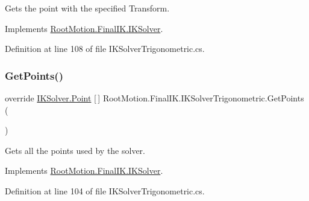 Gets the point with the specified Transform. 



Implements \mbox{\hyperlink{class_root_motion_1_1_final_i_k_1_1_i_k_solver_a8e845886025fb0ca404b85f6747f7281}{Root\+Motion.\+Final\+I\+K.\+I\+K\+Solver}}.



Definition at line 108 of file I\+K\+Solver\+Trigonometric.\+cs.

\mbox{\label{class_root_motion_1_1_final_i_k_1_1_i_k_solver_trigonometric_a4cdd035f3007bc29385299e6d3c3cea9}} 
\subsubsection{\texorpdfstring{Get\+Points()}{GetPoints()}}
{\footnotesize\ttfamily override \mbox{\hyperlink{class_root_motion_1_1_final_i_k_1_1_i_k_solver_1_1_point}{I\+K\+Solver.\+Point}} \mbox{[}$\,$\mbox{]} Root\+Motion.\+Final\+I\+K.\+I\+K\+Solver\+Trigonometric.\+Get\+Points (\begin{DoxyParamCaption}{ }\end{DoxyParamCaption})\hspace{0.3cm}{\ttfamily [virtual]}}



Gets all the points used by the solver. 



Implements \mbox{\hyperlink{class_root_motion_1_1_final_i_k_1_1_i_k_solver_a29b0746bebf6bd6645cdeb6617030bff}{Root\+Motion.\+Final\+I\+K.\+I\+K\+Solver}}.



Definition at line 104 of file I\+K\+Solver\+Trigonometric.\+cs.

\mbox{\label{class_root_motion_1_1_final_i_k_1_1_i_k_solver_trigonometric_a96e4567149a2309a7d1554ec6c8b3e16}} 
